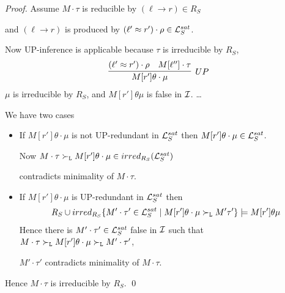        \begin{proof}
            Assume \( M\cdot\tau \) is reducible by \( (\ell\to r)\in R_S \)

            and \( (\ell\to r) \) is produced by \( (\ell'\approx r')\cdot\rho\in\mathcal{L}_S^{sat} \).

           \vspace{0.7em}
            Now UP-inference is applicable because \( \tau \) is irreducible by \( R_S \),
           \begin{gather*}
               \infer[UP]
                {M[r']\theta\cdot\mu}
                {(\ell'\mEQ r')\cdot\rho & M[\ell'']\cdot\tau}
           \end{gather*}
           \( \mu \) is irreducible by \( R_S \), and \( M[r']\theta\mu \){ is false in }\( \mathcal{I} \).
           \hfill\ldots

        We have two cases

           \begin{itemize}
               \item If \( M[r']\theta\cdot\mu \) is not UP-redundant in \( \mathcal{L}_S^{sat} \)
                then \( M[r']\theta\cdot\mu\in\mathcal{L}_S^{sat} \).

               \vspace{0.3em}
                Now \( M\cdot\tau\mathrel\succ_{\mathtt{L}}
                M[r']\theta\cdot\mu\in irred_{R_S}(\mathcal{L}_S^{sat}) \)

                contradicts minimality of \( M\cdot\tau \).
               \hfill
               \vspace{0.3em}

               \item If \( M[r']\theta\cdot\mu \) is UP-redundant in \( \mathcal{L}_S^{sat} \) then
               \vspace{-0.3em}
               \begin{gather*}
                    R_S \cup irred_{R_S}
                   \{
                        M'\cdot\tau'\in\mathcal{L}_S^{sat}\mid
                        M[r']\theta\cdot\mu \mathrel\succ_{\mathtt{L}} M'\tau'
                       \} \models M[r']\theta\mu
               \end{gather*}
                Hence there is \( M'\cdot\tau'\in\mathcal{L}_S^{sat} \) false in \( \mathcal{I} \) such that
               \( M\cdot\tau\mathrel\succ_{\mathtt{L}} M[r']\theta\cdot\mu\mathrel\succ_{\mathtt{L}} M'\cdot\tau' \),

               \( M'\cdot\tau' \) contradicts minimality of \( M\cdot\tau \).
               \hfill

           \end{itemize}

            Hence \( M\cdot\tau \) is irreducible by \( R_S \).
           \hfill\qed{}
       \end{proof}





